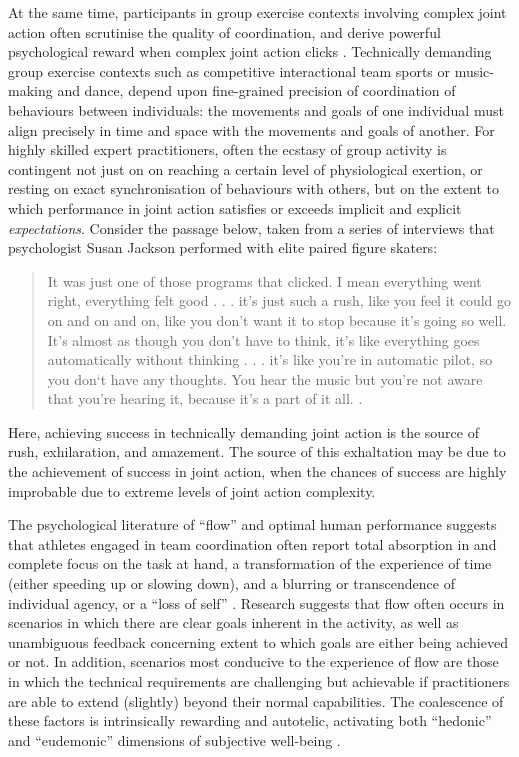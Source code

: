 \begin{CJK}{UTF8}{gbsn}
At the same time, participants in group exercise contexts involving complex joint action often scrutinise the quality of coordination, and derive powerful psychological reward when complex joint action clicks \citep{Jackson1992}.  Technically demanding group exercise contexts such as competitive interactional team sports or music-making and dance, depend upon fine-grained precision of coordination of behaviours between individuals: the movements and goals of one individual must align precisely in time and space with the movements and goals of another.  For highly skilled expert practitioners, often the ecstasy of group activity is contingent not just on on reaching a certain level of physiological exertion, or resting on exact synchronisation of behaviours with others, but on the extent to which performance in joint action satisfies or exceeds implicit and explicit \textit{expectations}.  Consider the passage below, taken from a series of interviews that psychologist Susan Jackson performed with elite paired figure skaters:
  \begin{quotation}
    It was just one of those programs that clicked. I mean everything went right, everything felt good . . . it's just such a rush, like you feel it could go on and on and on, like you don't want it to stop because it's going so well.  It's almost as though you don't have to think, it's like everything goes automatically without thinking . . . it's like you're in automatic pilot, so you don‘t have any thoughts.  You hear the music but you're not aware that you're hearing it, because it's a part of it all. \citep[168]{Jackson1992}.
  \end{quotation}

Here, achieving success in technically demanding joint action is the source of rush, exhilaration, and amazement.  The source of this exhaltation may be due to the achievement of success in joint action, when the chances of success are highly improbable due to extreme levels of joint action complexity.

The psychological literature of ``flow'' and optimal human performance \citep[see][]{Csikszentmihalyi1992} suggests that athletes engaged in team coordination often report total absorption in and complete focus on the task at hand, a transformation of the experience of time (either speeding up or slowing down), and a blurring or transcendence of individual agency, or a ``loss of self''   \citep{Csikszentmihalyi1992,Jackson1995,Jackson1999,McNeill1995}.  Research suggests that flow often occurs in scenarios in which there are clear goals inherent in the activity, as well as unambiguous feedback concerning extent to which goals are either being achieved or not.  In addition, scenarios most conducive to the experience of flow are those in which the technical requirements are challenging but achievable if practitioners are able to extend (slightly) beyond their normal capabilities\citep{Fong2015}.
The coalescence of these factors is intrinsically rewarding and autotelic, activating both ``hedonic'' and ``eudemonic'' dimensions of subjective well-being \citep{Huta2010,Fave2009}.


\end{CJK}
